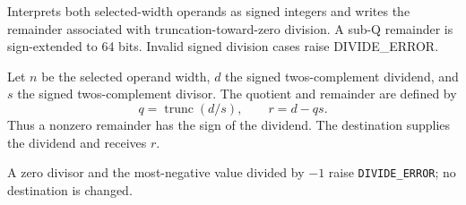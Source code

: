 Interprets both selected-width operands as signed integers and writes the remainder associated with truncation-toward-zero division. A sub-Q remainder is sign-extended to 64 bits. Invalid signed division cases raise DIVIDE\_ERROR.

Let \(n\) be the selected operand width, \(d\) the signed two\textquotesingle{}s-complement dividend, and \(s\) the signed two\textquotesingle{}s-complement divisor. The quotient and remainder are defined by
\[
  q = \operatorname{trunc}(d/s),
  \qquad r = d - qs .
\]
Thus a nonzero remainder has the sign of the dividend. The destination supplies the dividend and receives \(r\).

A zero divisor and the most-negative value divided by \(-1\) raise \texttt{DIVIDE\_ERROR}; no destination is changed.
